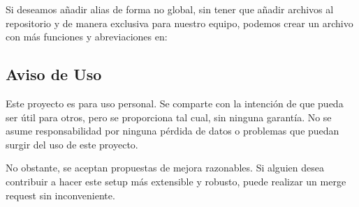 \documentclass[11pt]{article}
\begin{document}
\begin{center}
\end{center}

Si deseamos añadir alias de forma no global, sin tener que añadir archivos al repositorio y de manera exclusiva para nuestro equipo, podemos crear un archivo con más funciones y abreviaciones en:

\begin{center}
\end{center}

\subsection*{Aviso de Uso}

Este proyecto es para uso personal. Se comparte con la intención de que pueda ser útil para otros, pero se proporciona tal cual, sin ninguna garantía. No se asume responsabilidad por ninguna pérdida de datos o problemas que puedan surgir del uso de este proyecto.

\vspace{5pt}

No obstante, se aceptan propuestas de mejora razonables. Si alguien desea contribuir a hacer este setup más extensible y robusto, puede realizar un merge request sin inconveniente.
\end{document}
